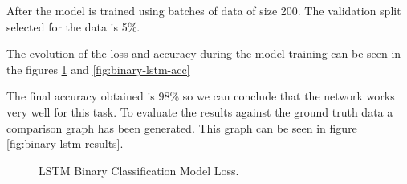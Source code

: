After the model is trained using batches of data of size 200. The validation split selected for the data is 5\%.

The evolution of the loss and accuracy during the model training can be seen in the figures \ref{fig:binary-lstm-loss} and \ref{fig:binary-lstm-acc}

The final accuracy obtained is 98\% so we can conclude that the network works very well for this task. To evaluate the results against the ground truth data a comparison graph has been generated. This graph can be seen in figure \ref{fig:binary-lstm-results}.

\begin{figure}[H]
\begin{center}
\end{center}
\decoRule
\caption[LSTM Binary Classification Model Loss]{LSTM Binary Classification Model Loss.}
\label{fig:binary-lstm-loss}\end{figure}

